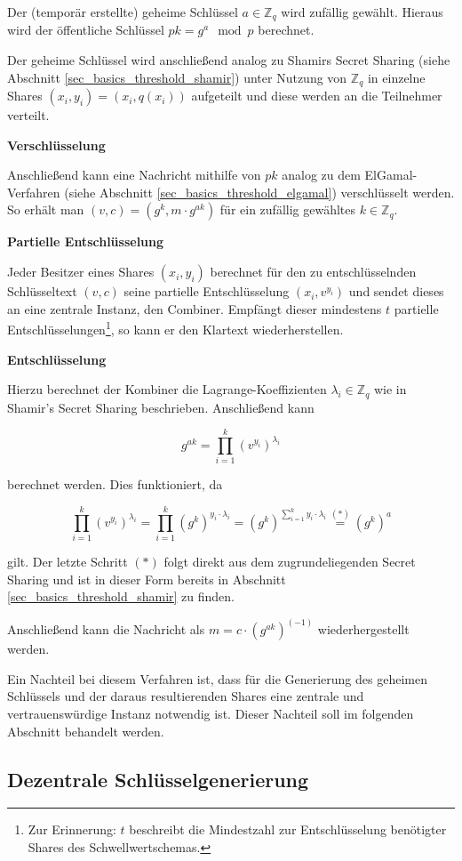 Der (temporär erstellte) geheime Schlüssel \(a \in \mathbb{Z}_q\) wird zufällig gewählt. Hieraus wird der öffentliche Schlüssel \(pk = g^a \mod p\) berechnet.

Der geheime Schlüssel wird anschließend analog zu Shamirs Secret Sharing (siehe Abschnitt \ref{sec_basics_threshold_shamir}) unter Nutzung von \(\mathbb{Z}_q\) in einzelne Shares \((x_i, y_i) = (x_i, q(x_i))\) aufgeteilt und diese werden an die Teilnehmer verteilt. 

\textbf{Verschlüsselung}

Anschließend kann eine Nachricht mithilfe von \(pk\) analog zu dem ElGamal-Verfahren (siehe Abschnitt \ref{sec_basics_threshold_elgamal}) verschlüsselt werden. So erhält man \((v,c) = (g^k, m \cdot g^{ak})\) für ein zufällig gewähltes \(k \in \mathbb{Z}_q\).

\textbf{Partielle Entschlüsselung}

Jeder Besitzer eines Shares \((x_i, y_i)\) berechnet für den zu entschlüsselnden Schlüsseltext \((v,c)\) seine partielle Entschlüsselung \((x_i, v^{y_i})\) und sendet dieses an eine zentrale Instanz, den Combiner. Empfängt dieser mindestens \(t\) partielle Entschlüsselungen\footnote{
  Zur Erinnerung: \(t\) beschreibt die Mindestzahl zur Entschlüsselung benötigter Shares des Schwellwertschemas.
}, so kann er den Klartext wiederherstellen.

\textbf{Entschlüsselung}


Hierzu berechnet der Kombiner die Lagrange-Koeffizienten \(\lambda_i \in \mathbb{Z}_q\) wie in Shamir's Secret Sharing beschrieben. Anschließend kann
 
\[g^{ak} = \prod_{i=1}^k (v^{y_i})^{\lambda_i}\]

berechnet werden. Dies funktioniert, da 

\[
\prod_{i=1}^k (v^{y_i})^{\lambda_i} = 
\prod_{i=1}^k (g^k)^{y_i \cdot \lambda_i} = 
(g^k)^{\sum_{i=1}^{k} y_i \cdot \lambda_i} \overset{(*)}{=}
(g^k)^a
\]

gilt. Der letzte Schritt \((*)\) folgt direkt aus dem zugrundeliegenden Secret Sharing und ist in dieser Form bereits in Abschnitt \ref{sec_basics_threshold_shamir} zu finden.

Anschließend kann die Nachricht als \(m = c \cdot (g^{ak})^{(-1)}\) wiederhergestellt werden. 

Ein Nachteil bei diesem Verfahren ist, dass für die Generierung des geheimen Schlüssels und der daraus resultierenden Shares eine zentrale und vertrauenswürdige Instanz notwendig ist. Dieser Nachteil soll im folgenden Abschnitt behandelt werden.

\subsection{Dezentrale Schlüsselgenerierung}